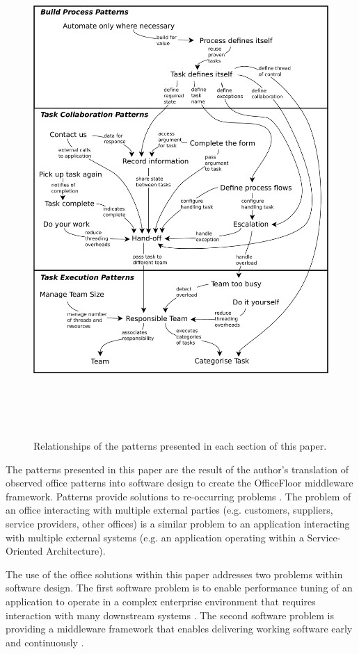 \documentclass[prodmode]{style/acmlarge}
\begin{document}
\begin{figure}[!t]
\centering
\includegraphics[height=7.4in]{PatternRelationships}
\caption{Relationships of the patterns presented in each section of this paper.}
\label{fig:PatternRelationships}
\end{figure}

The patterns presented in this paper are the result of the author's translation
of observed office patterns into software design to create the OfficeFloor
middleware framework.  Patterns provide solutions to re-occurring problems
\cite{pattern-language}.  The problem of an office interacting with multiple
external parties (e.g. customers, suppliers, service providers, other offices)
is a similar problem to an application interacting with multiple external
systems (e.g. an application operating within a Service-Oriented Architecture).

The use of the office solutions within this paper addresses two problems within
software design.  The first software problem is to enable performance tuning of
an application to operate in a complex enterprise environment that requires
interaction with many downstream systems \cite{reverse-ten-k-problem}.  The
second software problem is providing a middleware framework that enables
delivering working software early and continuously \cite{agile-manifesto}.
\end{document}
